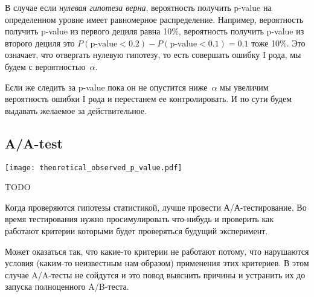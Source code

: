 \documentclass[../handbook.tex]{subfiles}
\begin{document}

В случае если \emph{нулевая гипотеза верна}, вероятность получить p-value на
определенном уровне имеет равномерное распределение. Например, вероятность
получить p-value из первого дециля равна 10\%, вероятность получить p-value из
второго дециля это $P(\text{p-value} < 0.2) - P(\text{p-value} < 0.1) = 0.1$
тоже 10\%. Это означает, что отвергать нулевую гипотезу, то есть совершать ошибку I рода, мы будем с вероятностью~$\alpha$. 

Если же следить за p-value пока он не опустится ниже~$\alpha$ мы увеличим вероятность ошибки I рода и перестанем ее контролировать. И по сути будем выдавать желаемое за действительное.

\subsection{A/A-test}

\begin{marginfigure}
    \texttt{[image: theoretical\_observed\_p\_value.pdf]}
    \caption{TODO}
\end{marginfigure}

Когда проверяются гипотезы статистикой, лучше провести
А/А-тес\-ти\-ро\-ва\-ние. Во время тестирования нужно просимулировать
что-нибудь и проверить как работают критерии которыми будет проверяться будущий
эксперимент.

Может оказаться так, что какие-то критерии не работают потому, что нарушаются
условия (каким-то неизвестным нам образом) применения этих критериев. В этом
случае A/A-тесты не сойдутся и это повод выяснить причины и устранить их до
запуска полноценного A/B-теста.
\end{document}
